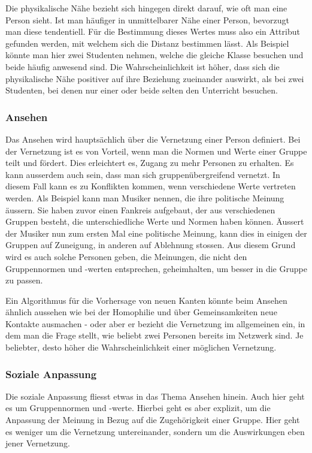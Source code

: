 Die physikalische Nähe bezieht sich hingegen direkt darauf, wie oft man eine Person sieht. Ist man häufiger in
unmittelbarer Nähe einer Person, bevorzugt man diese tendentiell. Für die Bestimmung dieses Wertes muss also ein Attribut
gefunden werden, mit welchem sich die Distanz bestimmen lässt. Als Beispiel könnte man hier zwei Studenten nehmen,
welche die gleiche Klasse besuchen und beide häufig anwesend sind. Die Wahrscheinlichkeit ist höher, dass sich die
physikalische Nähe positiver auf ihre Beziehung zueinander auswirkt, als bei zwei Studenten, bei denen nur einer oder
beide selten den Unterricht besuchen.

\subsubsection{Ansehen}
Das Ansehen wird hauptsächlich über die Vernetzung einer Person definiert. Bei der Vernetzung ist es von Vorteil, wenn
man die Normen und Werte einer Gruppe teilt und fördert. Dies erleichtert es, Zugang zu mehr Personen zu erhalten. Es
kann ausserdem auch sein, dass man sich gruppenübergreifend vernetzt. In diesem Fall kann es zu Konflikten kommen, wenn
verschiedene Werte vertreten werden. Als Beispiel kann man Musiker nennen, die ihre politische Meinung äussern. Sie
haben zuvor einen Fankreis aufgebaut, der aus verschiedenen Gruppen besteht, die unterschiedliche Werte und Normen
haben können. Äussert der Musiker nun zum ersten Mal eine politische Meinung, kann dies in einigen der Gruppen auf
Zuneigung, in anderen auf Ablehnung stossen. Aus diesem Grund wird es auch solche Personen geben, die Meinungen, die
nicht den Gruppennormen und -werten entsprechen, geheimhalten, um besser in die Gruppe zu passen.

Ein Algorithmus für die Vorhersage von neuen Kanten könnte beim Ansehen ähnlich aussehen wie bei der Homophilie und über
Gemeinsamkeiten neue Kontakte ausmachen - oder aber er bezieht die Vernetzung im allgemeinen ein, in dem man die Frage
stellt, wie beliebt zwei Personen bereits im Netzwerk sind. Je beliebter, desto höher die Wahrscheinlichkeit einer
möglichen Vernetzung.

\subsubsection{Soziale Anpassung}
Die soziale Anpassung fliesst etwas in das Thema Ansehen hinein. Auch hier geht es um Gruppennormen und -werte. Hierbei
geht es aber explizit, um die Anpassung der Meinung in Bezug auf die Zugehörigkeit einer Gruppe. Hier geht es weniger
um die Vernetzung untereinander, sondern um die Auswirkungen eben jener Vernetzung.

